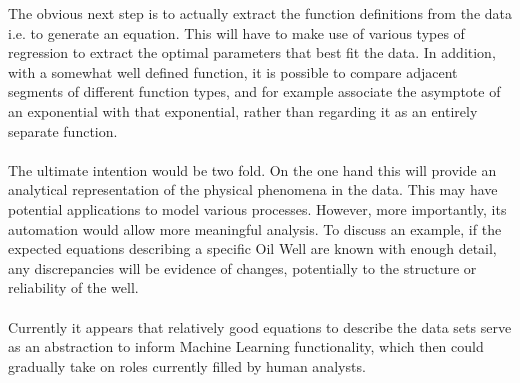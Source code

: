 \documentclass[main.tex]{subfiles}
\begin{document}
    The obvious next step is to actually extract the function definitions from the data i.e. to generate an equation. This will have to make use of various types of regression to extract the optimal parameters that best fit the data. In addition, with a somewhat well defined function, it is possible to compare adjacent segments of different function types, and for example associate the asymptote of an exponential with that exponential, rather than regarding it as an entirely separate function.
    \\\\
    The ultimate intention would be two fold. On the one hand this will provide an analytical representation of the physical phenomena in the data. This may have potential applications to model various processes. However, more importantly, its automation would allow more meaningful analysis. To discuss an example, if the expected equations describing a specific Oil Well are known with enough detail, any discrepancies will be evidence of changes, potentially to the structure or reliability of the well.
    \\\\
    Currently it appears that relatively good equations to describe the data sets serve as an abstraction to inform Machine Learning functionality, which then could gradually take on roles currently filled by human analysts.
    
\end{document}
